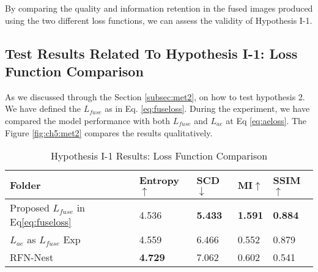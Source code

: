 By comparing the quality and information retention in the fused images produced using the two different loss functions, we can assess the validity of Hypothesis I-1.

\subsection{Test Results Related To Hypothesis I-1: Loss Function Comparison} \label{subsec:met2res}

As we discussed through the Section \ref{subsec:met2}, on how to test hypothesis 2. We have defined the $L_{fuse}$ as in Eq. \ref{eq:fuseloss}. During the experiment, we have compared the model performance with both $L_{fuse}$ and $L_{ae}$ at Eq \ref{eq:aeloss}. The Figure \ref{fig:ch5:met2} compares the results qualitatively.

\begin{table}[htbp]
    \centering
    \caption{Hypothesis I-1 Results: Loss Function Comparison}
    \label{tab:ch5:met2}
    \begin{tabular}{|l|l|l|l|l|}
        \hline
        \textbf{Folder} & \textbf{Entropy\cite{roberts2008assessment}$\uparrow$ } & \textbf{SCD\cite{aslantas2015new}$\downarrow$} & \textbf{MI\cite{qu2002information}$\uparrow$} & \textbf{SSIM\cite{ma2015perceptual}$\uparrow$} \\ \hline
        Proposed $L_{fuse}$ in Eq\ref{eq:fuseloss}            & 4.536                & \textbf{5.433}       & \textbf{1.591}           & \textbf{0.884}             \\ \hline
        $L_{ae}$ as $L_{fuse}$ Exp            & 4.559                & 6.466       & 0.552           & 0.879             \\ \hline
        RFN-Nest\cite{li2021rfn}            & \textbf{4.729}                & 7.062       & 0.602           & 0.541             \\ \hline
    \end{tabular}
\end{table}

